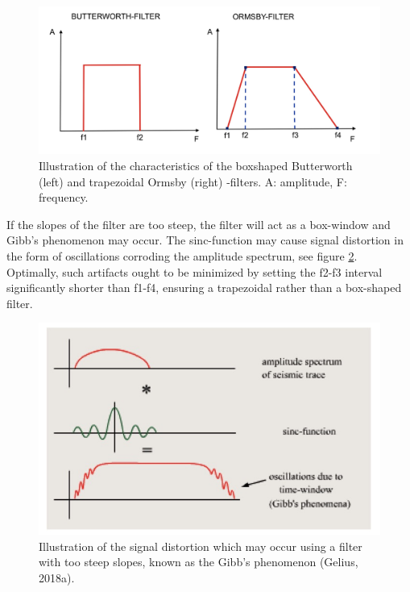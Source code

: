 \documentclass[10pt,a4paper]{article}
\begin{document}
\begin{figure}[H]
\includegraphics[width=\textwidth]{fig9.jpg}
\caption{Illustration of the characteristics of the boxshaped Butterworth (left) and trapezoidal Ormsby (right) -filters. A: amplitude, F: frequency.}
\label{fig9}
\end{figure}


\noindent If the slopes of the filter are too steep, the filter will act as a box-window and Gibb’s phenomenon may occur. The sinc-function may cause signal distortion in the form of oscillations corroding the amplitude spectrum, see figure \ref{fig10}. Optimally, such artifacts ought to be minimized by setting the f2-f3 interval significantly shorter than f1-f4, ensuring a trapezoidal rather than a box-shaped filter.


\begin{figure}[H]
\centering
\includegraphics[scale=0.4]{fig10.jpg}
\caption{Illustration of the signal distortion which may occur using a filter with too steep slopes, known as the Gibb’s phenomenon (Gelius, 2018a).}
\label{fig10}
\end{figure}
\end{document}
